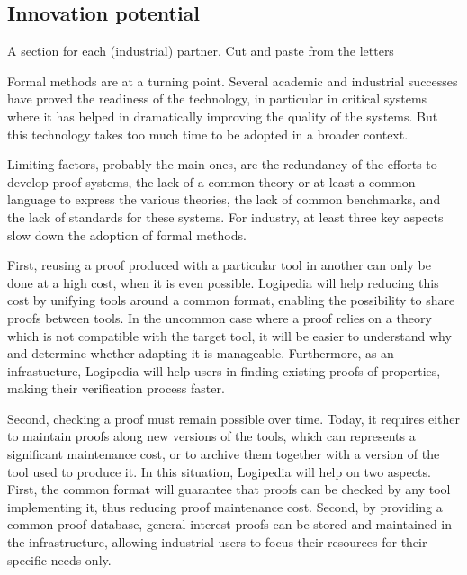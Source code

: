 \subsection*{Innovation potential}

{\color{red} A section for each (industrial) partner. Cut and paste from
  the letters}

Formal methods are at a turning point. Several academic and
industrial successes have proved the readiness of the technology,
in particular in critical systems where it has helped in
dramatically improving the quality of the systems. But this
technology takes too much time to be adopted in a broader context.

Limiting factors, probably the main ones, are the redundancy of the
efforts to develop proof systems, the lack of a common theory or at
least a common language to express the various theories, the lack of
common benchmarks, and the lack of standards for these systems.  For
industry, at least three key aspects slow down the adoption of formal
methods.

First, reusing a proof produced with a particular tool in another
can only be done at a high cost, when it is even possible.
Logipedia will help reducing this cost by unifying tools
around a common format, enabling the possibility to share proofs
between tools. In the uncommon case where a proof relies on a theory
which is not compatible with the target tool, it will be easier to
understand why and determine whether adapting it is manageable.
Furthermore, as an infrastucture, Logipedia will help users
in finding existing proofs of properties, making their verification
process faster.

Second, checking a proof must remain possible over time. Today, it
requires either to maintain proofs along new versions of the tools,
which can represents a significant maintenance cost, or to archive
them together with a version of the tool used to produce it. In this
situation, Logipedia will help on two aspects. First, the
common format will guarantee that proofs can be checked by any tool
implementing it, thus reducing proof maintenance cost. Second, by
providing a common proof database, general interest proofs can be
stored and maintained in the infrastructure, allowing industrial users
to focus their resources for their specific needs only.

